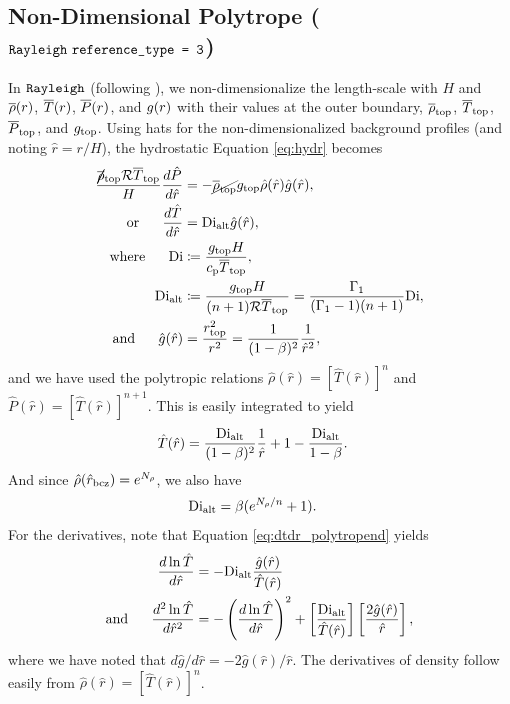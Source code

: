 \documentclass[12pt]{article}
\numberwithin{equation}{section}
\newcommand{\dialt}{\di_{\rm{alt}}}
\newcommand{\nrho}{N_\rho}
\begin{document}
\subsection{Non-Dimensional Polytrope ($\texttt{Rayleigh}\ \texttt{reference\_type = 3}$)} 
In $\texttt{Rayleigh}$ (following \citealt{Heimpel2022}), we non-dimensionalize the length-scale with $H$ and $\overline{\rho}(r)$, $\overline{T}(r)$, $\overline{P}(r)$, and $g(r)$ with their values at the outer boundary, $\overline{\rho}_{\rm{top}}$, $\overline{T}_{\rm{top}}$, $\overline{P}_{\rm{top}}$, and $g_{\rm{top}}$. Using hats for the non-dimensionalized background profiles (and noting $\hat{r}=r/H$), the hydrostatic Equation \eqref{eq:hydr} becomes
\begin{subequations}
\begin{align}
	\frac{\cancel{\rhoref}\topp\gasconst\tmpref\topp}{H}\frac{d\hat{P}}{d\hat{r}} &= -\cancel{\rhoref\topp}g\topp\hat{\rho}(\hat{r})\hat{g}(\hat{r}),\\
	\orr \frac{d\hat{T}}{d\hat{r}} &= \dialt\hat{g}(\hat{r})\label{eq:dtdr_polytropend},\\
	\where \di &\define \frac{g\topp H}{\cp\tmpref\topp},\\
	\dialt &\define \frac{g\topp H}{(n+1)\gasconst \tmpref\topp} = \frac{\gammaone}{(\gammaone-1)(n+1)}\di,\\
	\andd \hat{g}(\hat{r}) &= \frac{r\topp^2}{r^2} = \frac{1}{(1-\beta)^2}\frac{1}{\hat{r}^2},
\end{align}
\end{subequations}
and we have used the polytropic relations $\hat{\rho}(\hat{r})=[\hat{T}(\hat{r})]^n$ and $\hat{P}(\hat{r})=[\hat{T}(\hat{r})]^{n+1}$. This is easily integrated to yield
\begin{align}
	\hat{T}(\hat{r}) &= \frac{\dialt}{(1-\beta)^2}\frac{1}{\hat{r}} + 1 - \frac{\dialt}{1-\beta}.
\end{align}
And since $\hat{\rho}(\hat{r}\bcz) = e^{\nrho}$, we also have 
\begin{align}
	\dialt &= \beta (e^{\nrho/n} + 1). 
\end{align}
For the derivatives, note that Equation \eqref{eq:dtdr_polytropend} yields
\begin{align}
	\frac{d\ln\hat{T}}{d\hat{r}} &= -\dialt \frac{\hat{g}(\hat{r})}{\hat{T}(\hat{r})}\\
	\andd \frac{d^2\ln\hat{T}}{d\hat{r}^2} &= -\left(\frac{d\ln\hat{T}}{d\hat{r}}\right)^2 + \left[\frac{\dialt}{\hat{T}(\hat{r})}\right] \left[\frac{2\hat{g}(\hat{r})}{\hat{r}} \right],
\end{align}
where we have noted that $d\hat{g}/d\hat{r}=-2\hat{g}(\hat{r})/\hat{r}$. The derivatives of density follow easily from $\hat{\rho}(\hat{r})=[\hat{T}(\hat{r})]^n$.
\end{document}
